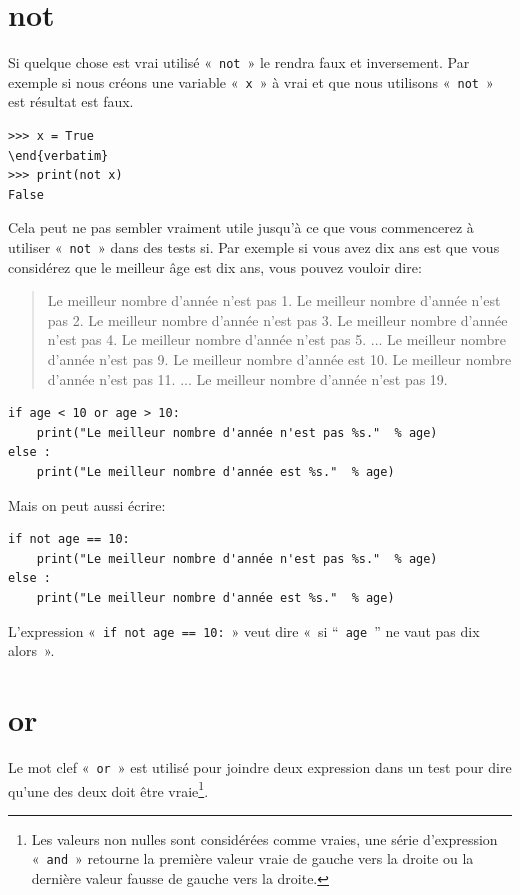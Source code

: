 \section*{not}
Si quelque chose est vrai utilisé «~\texttt{not}~» le rendra faux et inversement. Par exemple si nous créons une variable «~\texttt{x}~»  à vrai et que nous utilisons «~\texttt{not}~» est résultat est faux.
\begin{Verbatim}[frame=single,rulecolor=\color{gray}]
>>> x = True
\end{verbatim}
>>> print(not x)
False
\end{Verbatim}

Cela peut ne pas sembler vraiment utile jusqu'à ce que vous commencerez à utiliser «~\texttt{not}~»  dans des tests si. Par exemple si vous avez dix ans est que vous considérez que le meilleur âge est dix ans, vous pouvez vouloir dire:

\begin{quotation}
Le meilleur nombre d'année n'est pas 1.
Le meilleur nombre d'année n'est pas 2.
Le meilleur nombre d'année n'est pas 3.
Le meilleur nombre d'année n'est pas 4.
Le meilleur nombre d'année n'est pas 5.
...
Le meilleur nombre d'année n'est pas 9.
Le meilleur nombre d'année est 10.
Le meilleur nombre d'année n'est pas 11.
...
Le meilleur nombre d'année n'est pas 19.
\end{quotation}

\begin{Verbatim}[frame=single,rulecolor=\color{gray}]
if age < 10 or age > 10:
    print("Le meilleur nombre d'année n'est pas %s."  % age)
else :
    print("Le meilleur nombre d'année est %s."  % age)
\end{Verbatim}

Mais on peut aussi écrire:

\begin{Verbatim}[frame=single,rulecolor=\color{gray}]
if not age == 10:
    print("Le meilleur nombre d'année n'est pas %s."  % age)
else :
    print("Le meilleur nombre d'année est %s."  % age)
\end{Verbatim}

L'expression «~\texttt{if not age == 10:}~» veut dire «~si “~\texttt{age}~” ne vaut pas dix alors~».


\section*{or}

Le mot clef «~\texttt{or}~» est utilisé pour joindre deux expression dans un test pour dire qu'une des deux doit être vraie\footnote{Les valeurs non nulles sont considérées comme vraies, une série d'expression «~\texttt{and}~» retourne la première valeur vraie de gauche vers la droite ou la  dernière valeur fausse de gauche vers la droite.}.

